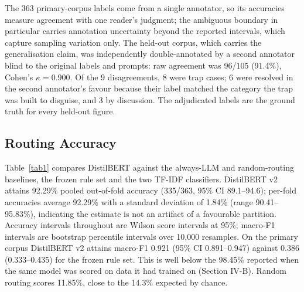 \documentclass[conference]{IEEEtran}
\begin{document}
The 363 primary-corpus labels come from a single annotator, so its accuracies measure agreement with one reader's judgment; the ambiguous boundary in particular carries annotation uncertainty beyond the reported intervals, which capture sampling variation only. The held-out corpus, which carries the generalisation claim, was independently double-annotated by a second annotator blind to the original labels and prompts: raw agreement was 96/105 (91.4\%), Cohen's $\kappa = 0.900$. Of the 9 disagreements, 8 were trap cases; 6 were resolved in the second annotator's favour because their label matched the category the trap was built to disguise, and 3 by discussion. The adjudicated labels are the ground truth for every held-out figure.

\subsection{Routing Accuracy}
Table~\ref{tab1} compares DistilBERT against the always-LLM and random-routing baselines, the frozen rule set and the two TF-IDF classifiers. DistilBERT v2 attains 92.29\% pooled out-of-fold accuracy (335/363, 95\% CI 89.1--94.6); per-fold accuracies average 92.29\% with a standard deviation of 1.84\% (range 90.41--95.83\%), indicating the estimate is not an artifact of a favourable partition. Accuracy intervals throughout are Wilson score intervals at 95\%; macro-F1 intervals are bootstrap percentile intervals over 10,000 resamples. On the primary corpus DistilBERT v2 attains macro-F1 0.921 (95\% CI 0.891--0.947) against 0.386 (0.333--0.435) for the frozen rule set. This is well below the 98.45\% reported when the same model was scored on data it had trained on (Section IV-B). Random routing scores 11.85\%, close to the 14.3\% expected by chance.
\end{document}
